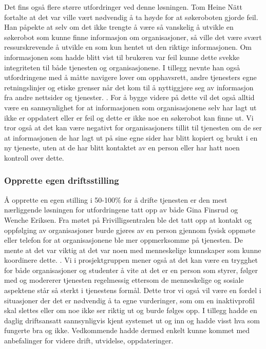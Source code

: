 Det fins også flere større utfordringer ved denne løsningen. Tom Heine Nätt fortalte at det var ville vært nødvendig å ta høyde for at søkeroboten gjorde feil. Han påpekte at selv om det ikke trengte å være så vanskelig å utvikle en søkerobot som kunne finne informasjon om organisasjoner, så ville det være svært ressurskrevende å utvikle en som kun hentet ut den riktige informasjonen. Om informasjonen som hadde blitt vist til brukeren var feil kunne dette svekke integriteten til både tjenesten og organisasjonene. I tillegg nevnte han også utfordringene med å måtte navigere lover om opphavsrett, andre tjenesters egne retningslinjer og etiske grenser når det kom til å nyttiggjøre seg av informasjon fra andre nettsider og tjenester. \cite{WEBCRAWLER-SAMTALE:23}. For å bygge videre på dette vil det også alltid være en sannsynlighet for at informasjonen som organisasjonene selv har lagt ut ikke er oppdatert eller er feil og dette er ikke noe en søkerobot kan finne ut. Vi tror også at det kan være negativt for organisasjoners tillit til tjenesten om de ser at informasjonen de har lagt ut på sine egne sider har blitt kopiert og brukt i en ny tjeneste, uten at de har blitt kontaktet av en person eller har hatt noen kontroll over dette.

\subsubsection{Opprette egen driftsstilling}
Å opprette en egen stilling i 50-100\% for å drifte tjenesten er den mest nærliggende løsningen for utfordringene tatt opp av både Gina Finsrud og Wenche Eriksen. Fra møtet på Frivilligsentralen ble det tatt opp at kontakt og oppfølging av organisasjoner burde gjøres av en person gjennom fysisk oppmøte eller telefon for at organisasjonene ble mer oppmerksomme på tjenesten. De mente at det var viktig at det var noen med menneskelige kunnskaper som kunne koordinere dette. \cite{FRIVILLIGSENTRALEN-INTERVJU:21}. Vi i prosjektgruppen mener også at det kan være en trygghet for både organisasjoner og studenter å vite at det er en person som styrer, følger med og modererer tjenesten regelmessig ettersom de menneskelige og sosiale aspektene står så sterkt i tjenestens formål. Dette tror vi også vil være en fordel i situasjoner der det er nødvendig å ta egne vurderinger, som om en inaktivprofil skal slettes eller om noe ikke ser riktig ut og burde følges opp. I tillegg hadde en daglig driftsansatt sannsynligvis kjent systemet ut og inn og hadde visst hva som fungerte bra og ikke. Vedkommende hadde dermed enkelt kunne kommet med anbefalinger for videre drift, utvidelse, oppdateringer.

